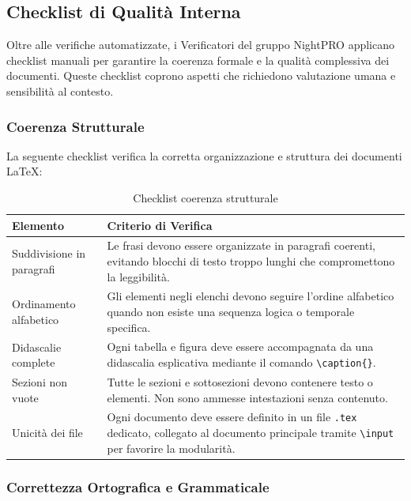 \documentclass[a4paper,11pt,oneside]{scrartcl}
\begin{document}
\subsection{Checklist di Qualità Interna}

Oltre alle verifiche automatizzate, i Verificatori del gruppo NightPRO applicano checklist manuali per garantire la coerenza formale e la qualità complessiva dei documenti. Queste checklist coprono aspetti che richiedono valutazione umana e sensibilità al contesto.

\subsubsection{Coerenza Strutturale}

La seguente checklist verifica la corretta organizzazione e struttura dei documenti \LaTeX:

\begin{table}[H]
\centering
\renewcommand{\arraystretch}{1.4}
\begin{tabularx}{\textwidth}{@{}p{}X@{}}
\toprule
\textbf{Elemento} & \textbf{Criterio di Verifica} \\
\midrule
Suddivisione in paragrafi & Le frasi devono essere organizzate in paragrafi coerenti, evitando blocchi di testo troppo lunghi che compromettono la leggibilità. \\
\midrule
Ordinamento alfabetico & Gli elementi negli elenchi devono seguire l'ordine alfabetico quando non esiste una sequenza logica o temporale specifica. \\
\midrule
Didascalie complete & Ogni tabella e figura deve essere accompagnata da una didascalia esplicativa mediante il comando \texttt{\textbackslash caption\{\}}. \\
\midrule
Sezioni non vuote & Tutte le sezioni e sottosezioni devono contenere testo o elementi. Non sono ammesse intestazioni senza contenuto. \\
\midrule
Unicità dei file & Ogni documento deve essere definito in un file \texttt{.tex} dedicato, collegato al documento principale tramite \texttt{\textbackslash input} per favorire la modularità. \\
\bottomrule
\end{tabularx}
\caption{Checklist coerenza strutturale}
\end{table}

\subsubsection{Correttezza Ortografica e Grammaticale}
\end{document}

